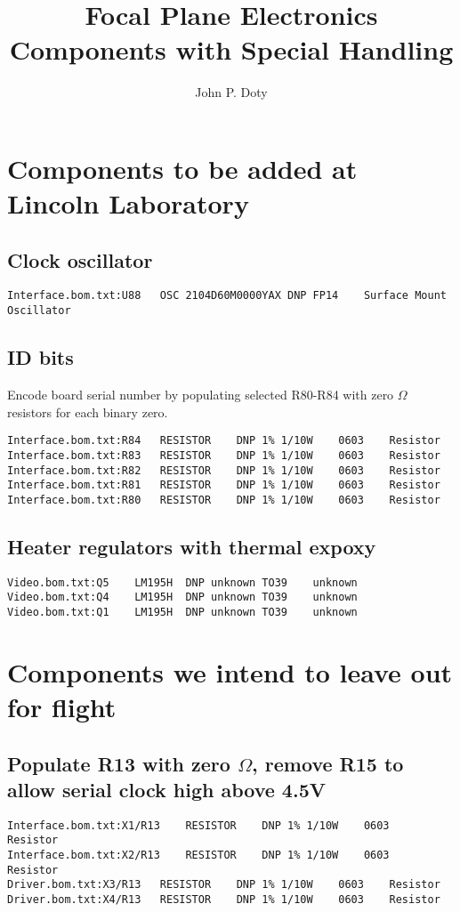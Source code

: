 \documentclass[11pt]{article}
\author{
John P. Doty
}
\title{Focal Plane Electronics Components with Special Handling}
\date{}
\begin{document}
\maketitle
\begin{center}

\end{center}


\section{Components to be added at Lincoln Laboratory}
\subsection{Clock oscillator}
\begin{verbatim}
Interface.bom.txt:U88	OSC	2104D60M0000YAX	DNP	FP14	Surface Mount Oscillator	
\end{verbatim}

\subsection{ID bits}

Encode board serial number
by populating selected R80-R84
with zero $\Omega$ resistors for
each binary zero.

\begin{verbatim}
Interface.bom.txt:R84	RESISTOR	DNP	1% 1/10W	0603	Resistor	
Interface.bom.txt:R83	RESISTOR	DNP	1% 1/10W	0603	Resistor	
Interface.bom.txt:R82	RESISTOR	DNP	1% 1/10W	0603	Resistor	
Interface.bom.txt:R81	RESISTOR	DNP	1% 1/10W	0603	Resistor	
Interface.bom.txt:R80	RESISTOR	DNP	1% 1/10W	0603	Resistor	
\end{verbatim}

\subsection{Heater regulators with thermal expoxy}
\begin{verbatim}
Video.bom.txt:Q5	LM195H	DNP	unknown	TO39	unknown	
Video.bom.txt:Q4	LM195H	DNP	unknown	TO39	unknown	
Video.bom.txt:Q1	LM195H	DNP	unknown	TO39	unknown	
\end{verbatim}


\section{Components we intend to leave out for flight}

\subsection{Populate R13 with zero $\Omega$, remove R15 to allow serial clock high above 4.5V}
\begin{verbatim}
Interface.bom.txt:X1/R13	RESISTOR	DNP	1% 1/10W	0603	Resistor	
Interface.bom.txt:X2/R13	RESISTOR	DNP	1% 1/10W	0603	Resistor	
Driver.bom.txt:X3/R13	RESISTOR	DNP	1% 1/10W	0603	Resistor	
Driver.bom.txt:X4/R13	RESISTOR	DNP	1% 1/10W	0603	Resistor	
\end{verbatim}
\end{document}

